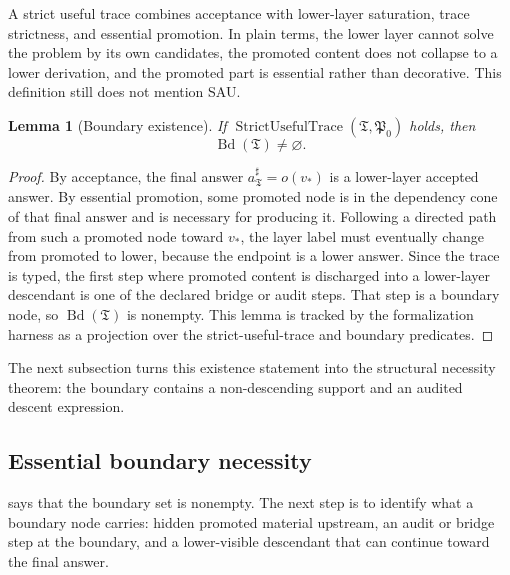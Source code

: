 \documentclass[11pt]{article}
\newcommand{\Bd}{\operatorname{Bd}}
\newtheorem{lemma}[theorem]{Lemma}
\theoremstyle{definition}
\begin{document}
A strict useful trace combines acceptance with lower-layer saturation, trace
strictness, and essential promotion.  In plain terms, the lower layer cannot
solve the problem by its own candidates, the promoted content does not collapse
to a lower derivation, and the promoted part is essential rather than
decorative.  This definition still does not mention SAU.

\begin{lemma}[Boundary existence]
\label{lem:sau-boundary-existence}
If \(\operatorname{StrictUsefulTrace}(\mathfrak T,\mathfrak P_0)\) holds, then
\[
\Bd(\mathfrak T)\neq\varnothing.
\]
\end{lemma}

\begin{proof}
By acceptance, the final answer \(a^\sharp_{\mathfrak T}=o(v_\ast)\) is a
lower-layer accepted answer.  By essential promotion, some promoted node is in
the dependency cone of that final answer and is necessary for producing it.
Following a directed path from such a promoted node toward \(v_\ast\), the layer
label must eventually change from promoted to lower, because the endpoint is a
lower answer.  Since the trace is typed, the first step where promoted content
is discharged into a lower-layer descendant is one of the declared bridge or
audit steps.  That step is a boundary node, so \(\Bd(\mathfrak T)\) is nonempty.
This lemma is tracked by the formalization harness as a projection over the
strict-useful-trace and boundary predicates.
\end{proof}

The next subsection turns this existence statement into the structural
necessity theorem: the boundary contains a non-descending support and an audited
descent expression.

\subsection{Essential boundary necessity}
\label{subsec:necessity-essential-boundary}

 says that the boundary set is nonempty.  The
next step is to identify what a boundary node carries: hidden promoted material
upstream, an audit or bridge step at the boundary, and a lower-visible
descendant that can continue toward the final answer.
\end{document}
